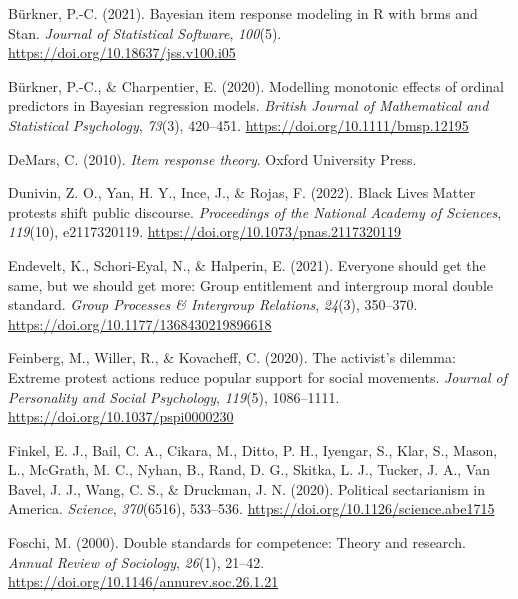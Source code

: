\documentclass[twocolumn, 11pt, letterpaper]{article}
\newenvironment{CSLReferences}[2]{}{}
\begin{document}
\begin{CSLReferences}{1}{0}
\leavevmode{}%
Bürkner, P.-C. (2021). Bayesian item response modeling in {R} with brms
and {Stan}. \emph{Journal of Statistical Software}, \emph{100}(5).
\url{https://doi.org/10.18637/jss.v100.i05}

\leavevmode{}%
Bürkner, P.-C., \& Charpentier, E. (2020). Modelling monotonic effects
of ordinal predictors in {Bayesian} regression models. \emph{British
Journal of Mathematical and Statistical Psychology}, \emph{73}(3),
420--451. \url{https://doi.org/10.1111/bmsp.12195}

\leavevmode{}%
DeMars, C. (2010). \emph{Item response theory}. Oxford University Press.

\leavevmode{}%
Dunivin, Z. O., Yan, H. Y., Ince, J., \& Rojas, F. (2022). Black {Lives}
{Matter} protests shift public discourse. \emph{Proceedings of the
National Academy of Sciences}, \emph{119}(10), e2117320119.
\url{https://doi.org/10.1073/pnas.2117320119}

\leavevmode{}%
Endevelt, K., Schori-Eyal, N., \& Halperin, E. (2021). Everyone should
get the same, but we should get more: Group entitlement and intergroup
moral double standard. \emph{Group Processes \& Intergroup Relations},
\emph{24}(3), 350--370. \url{https://doi.org/10.1177/1368430219896618}

\leavevmode{}%
Feinberg, M., Willer, R., \& Kovacheff, C. (2020). The activist's
dilemma: {Extreme} protest actions reduce popular support for social
movements. \emph{Journal of Personality and Social Psychology},
\emph{119}(5), 1086--1111. \url{https://doi.org/10.1037/pspi0000230}

\leavevmode{}%
Finkel, E. J., Bail, C. A., Cikara, M., Ditto, P. H., Iyengar, S., Klar,
S., Mason, L., McGrath, M. C., Nyhan, B., Rand, D. G., Skitka, L. J.,
Tucker, J. A., Van Bavel, J. J., Wang, C. S., \& Druckman, J. N. (2020).
Political sectarianism in {America}. \emph{Science}, \emph{370}(6516),
533--536. \url{https://doi.org/10.1126/science.abe1715}

\leavevmode{}%
Foschi, M. (2000). Double standards for competence: Theory and research.
\emph{Annual Review of Sociology}, \emph{26}(1), 21--42.
\url{https://doi.org/10.1146/annurev.soc.26.1.21}


\end{CSLReferences}
\end{document}
